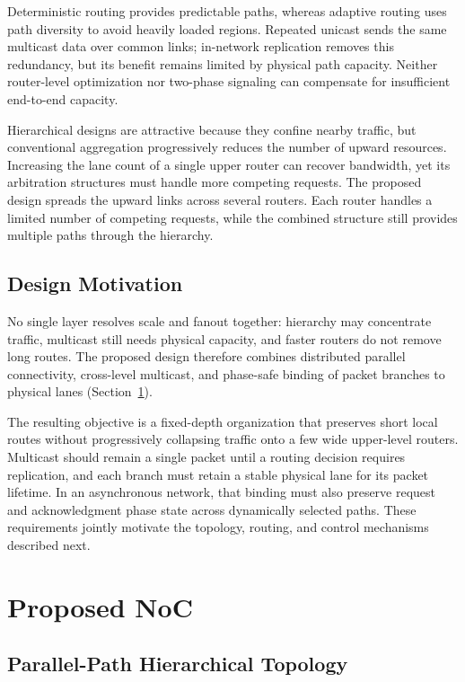 \documentclass[conference]{IEEEtran}
\begin{document}
Deterministic routing provides predictable paths, whereas adaptive routing
uses path diversity to avoid heavily loaded regions. Repeated unicast sends
the same multicast data over common links; in-network replication removes this
redundancy, but its benefit remains limited by physical path capacity.
Neither router-level optimization nor two-phase signaling can compensate for
insufficient end-to-end capacity.

Hierarchical designs are attractive because they confine nearby traffic,
but conventional aggregation progressively reduces the number of upward
resources. Increasing the lane count of a single upper router can recover
bandwidth, yet its arbitration structures must handle more competing requests.
The proposed design spreads the upward links across several routers. Each
router handles a limited number of competing requests, while the combined
structure still provides multiple paths through the hierarchy.

\subsection{Design Motivation}\label{sec:motivation}

No single layer resolves scale and fanout together: hierarchy may
concentrate traffic, multicast still needs physical capacity, and faster
routers do not remove long routes. The proposed design therefore combines
distributed parallel connectivity, cross-level multicast, and phase-safe
binding of packet branches to physical lanes (Section~\ref{sec:proposed}).

The resulting objective is a fixed-depth organization that preserves short
local routes without progressively collapsing traffic onto a few wide
upper-level routers. Multicast should remain a single packet until a
routing decision requires replication, and each branch must retain a
stable physical lane for its packet lifetime. In an asynchronous network,
that binding must also preserve request and acknowledgment phase state
across dynamically selected paths. These requirements jointly motivate
the topology, routing, and control mechanisms described next.

\section{Proposed NoC}\label{sec:proposed}

\subsection{Parallel-Path Hierarchical Topology}\label{sec:topology}
\end{document}
